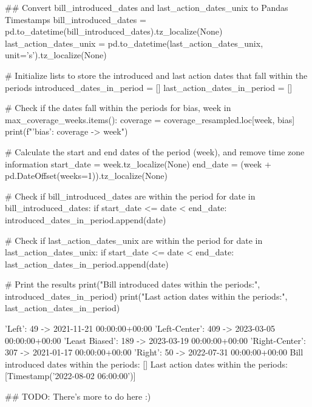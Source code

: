 \begin{pyin}
\## Convert bill_introduced_dates and last_action_dates_unix to Pandas Timestamps
bill_introduced_dates = pd.to_datetime(bill_introduced_dates).tz_localize(None)
last_action_dates_unix = pd.to_datetime(last_action_dates_unix, unit='s').tz_localize(None)

# Initialize lists to store the introduced and last action dates that fall within the periods
introduced_dates_in_period = []
last_action_dates_in_period = []

# Check if the dates fall within the periods
for bias, week in max_coverage_weeks.items():
    coverage = coverage_resampled.loc[week, bias]
    print(f"'{bias}': {coverage} -> {week}")

    # Calculate the start and end dates of the period (week), and remove time zone information
    start_date = week.tz_localize(None)
    end_date = (week + pd.DateOffset(weeks=1)).tz_localize(None)

    # Check if bill_introduced_dates are within the period
    for date in bill_introduced_dates:
        if start_date <= date < end_date:
            introduced_dates_in_period.append(date)

    # Check if last_action_dates_unix are within the period
    for date in last_action_dates_unix:
        if start_date <= date < end_date:
            last_action_dates_in_period.append(date)

# Print the results
print("Bill introduced dates within the periods:", introduced_dates_in_period)
print("Last action dates within the periods:", last_action_dates_in_period)
\end{pyin}

\begin{pyprint}
'Left': 49 -> 2021-11-21 00:00:00+00:00
'Left-Center': 409 -> 2023-03-05 00:00:00+00:00
'Least Biased': 189 -> 2023-03-19 00:00:00+00:00
'Right-Center': 307 -> 2021-01-17 00:00:00+00:00
'Right': 50 -> 2022-07-31 00:00:00+00:00
Bill introduced dates within the periods: []
Last action dates within the periods: [Timestamp('2022-08-02 06:00:00')]
\end{pyprint}

\begin{pyin}
\## TODO: There's more to do here :)
\end{pyin}


